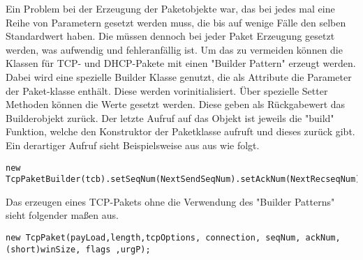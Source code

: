 Ein Problem bei der Erzeugung der Paketobjekte war, das bei jedes mal eine Reihe von Parametern gesetzt werden muss, die bis auf wenige Fälle den selben Standardwert haben. Die müssen dennoch bei jeder Paket Erzeugung gesetzt werden, was aufwendig und fehleranfällig ist. Um das zu vermeiden können die Klassen für TCP- und DHCP-Pakete mit einen "{}Builder Pattern"{} erzeugt werden.  Dabei wird eine spezielle Builder Klasse genutzt, die als Attribute die Parameter der Paket-klasse enthält. Diese werden vorinitialisiert. Über spezielle Setter Methoden können die Werte gesetzt werden. Diese geben als Rückgabewert das Builderobjekt zurück. Der letzte Aufruf auf das Objekt ist jeweils die {}"build"{} Funktion, welche den Konstruktor der Paketklasse aufruft und dieses zurück gibt. Ein derartiger Aufruf sieht Beispielsweise aus aus wie folgt. 
\lstset{language=Java}
\begin{lstlisting}
new TcpPaketBuilder(tcb).setSeqNum(NextSendSeqNum).setAckNum(NextRecseqNum).setAck().build()
\end{lstlisting}
Das erzeugen eines TCP-Pakets ohne die Verwendung des "{}Builder Patterns"{} sieht folgender maßen aus. 

\begin{lstlisting}
new TcpPaket(payLoad,length,tcpOptions, connection, seqNum, ackNum, (short)winSize, flags ,urgP);
\end{lstlisting}



